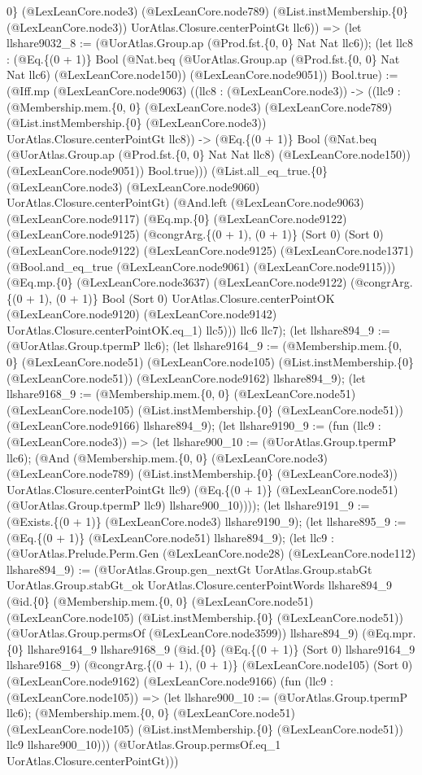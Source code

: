 \documentclass[11pt]{article}
\begin{document}
0\} (@LexLeanCore.node3) (@LexLeanCore.node789) (@List.instMembership.\{0\} (@LexLeanCore.node3)) UorAtlas.Closure.centerPointGt llc6)) => (let llshare9032\_8 := (@UorAtlas.Group.ap (@Prod.fst.\{0, 0\} Nat Nat llc6)); (let llc8 : (@Eq.\{(0 + 1)\} Bool (@Nat.beq (@UorAtlas.Group.ap (@Prod.fst.\{0, 0\} Nat Nat llc6) (@LexLeanCore.node150)) (@LexLeanCore.node9051)) Bool.true) := (@Iff.mp (@LexLeanCore.node9063) ((llc8 : (@LexLeanCore.node3)) -> ((llc9 : (@Membership.mem.\{0, 0\} (@LexLeanCore.node3) (@LexLeanCore.node789) (@List.instMembership.\{0\} (@LexLeanCore.node3)) UorAtlas.Closure.centerPointGt llc8)) -> (@Eq.\{(0 + 1)\} Bool (@Nat.beq (@UorAtlas.Group.ap (@Prod.fst.\{0, 0\} Nat Nat llc8) (@LexLeanCore.node150)) (@LexLeanCore.node9051)) Bool.true))) (@List.all\_eq\_true.\{0\} (@LexLeanCore.node3) (@LexLeanCore.node9060) UorAtlas.Closure.centerPointGt) (@And.left (@LexLeanCore.node9063) (@LexLeanCore.node9117) (@Eq.mp.\{0\} (@LexLeanCore.node9122) (@LexLeanCore.node9125) (@congrArg.\{(0 + 1), (0 + 1)\} (Sort 0) (Sort 0) (@LexLeanCore.node9122) (@LexLeanCore.node9125) (@LexLeanCore.node1371) (@Bool.and\_eq\_true (@LexLeanCore.node9061) (@LexLeanCore.node9115))) (@Eq.mp.\{0\} (@LexLeanCore.node3637) (@LexLeanCore.node9122) (@congrArg.\{(0 + 1), (0 + 1)\} Bool (Sort 0) UorAtlas.Closure.centerPointOK (@LexLeanCore.node9120) (@LexLeanCore.node9142) UorAtlas.Closure.centerPointOK.eq\_1) llc5))) llc6 llc7); (let llshare894\_9 := (@UorAtlas.Group.tpermP llc6); (let llshare9164\_9 := (@Membership.mem.\{0, 0\} (@LexLeanCore.node51) (@LexLeanCore.node105) (@List.instMembership.\{0\} (@LexLeanCore.node51)) (@LexLeanCore.node9162) llshare894\_9); (let llshare9168\_9 := (@Membership.mem.\{0, 0\} (@LexLeanCore.node51) (@LexLeanCore.node105) (@List.instMembership.\{0\} (@LexLeanCore.node51)) (@LexLeanCore.node9166) llshare894\_9); (let llshare9190\_9 := (fun (llc9 : (@LexLeanCore.node3)) => (let llshare900\_10 := (@UorAtlas.Group.tpermP llc6); (@And (@Membership.mem.\{0, 0\} (@LexLeanCore.node3) (@LexLeanCore.node789) (@List.instMembership.\{0\} (@LexLeanCore.node3)) UorAtlas.Closure.centerPointGt llc9) (@Eq.\{(0 + 1)\} (@LexLeanCore.node51) (@UorAtlas.Group.tpermP llc9) llshare900\_10)))); (let llshare9191\_9 := (@Exists.\{(0 + 1)\} (@LexLeanCore.node3) llshare9190\_9); (let llshare895\_9 := (@Eq.\{(0 + 1)\} (@LexLeanCore.node51) llshare894\_9); (let llc9 : (@UorAtlas.Prelude.Perm.Gen (@LexLeanCore.node28) (@LexLeanCore.node112) llshare894\_9) := (@UorAtlas.Group.gen\_nextGt UorAtlas.Group.stabGt UorAtlas.Group.stabGt\_ok UorAtlas.Closure.centerPointWords llshare894\_9 (@id.\{0\} (@Membership.mem.\{0, 0\} (@LexLeanCore.node51) (@LexLeanCore.node105) (@List.instMembership.\{0\} (@LexLeanCore.node51)) (@UorAtlas.Group.permsOf (@LexLeanCore.node3599)) llshare894\_9) (@Eq.mpr.\{0\} llshare9164\_9 llshare9168\_9 (@id.\{0\} (@Eq.\{(0 + 1)\} (Sort 0) llshare9164\_9 llshare9168\_9) (@congrArg.\{(0 + 1), (0 + 1)\} (@LexLeanCore.node105) (Sort 0) (@LexLeanCore.node9162) (@LexLeanCore.node9166) (fun (llc9 : (@LexLeanCore.node105)) => (let llshare900\_10 := (@UorAtlas.Group.tpermP llc6); (@Membership.mem.\{0, 0\} (@LexLeanCore.node51) (@LexLeanCore.node105) (@List.instMembership.\{0\} (@LexLeanCore.node51)) llc9 llshare900\_10))) (@UorAtlas.Group.permsOf.eq\_1 UorAtlas.Closure.centerPointGt))) 
\end{document}
